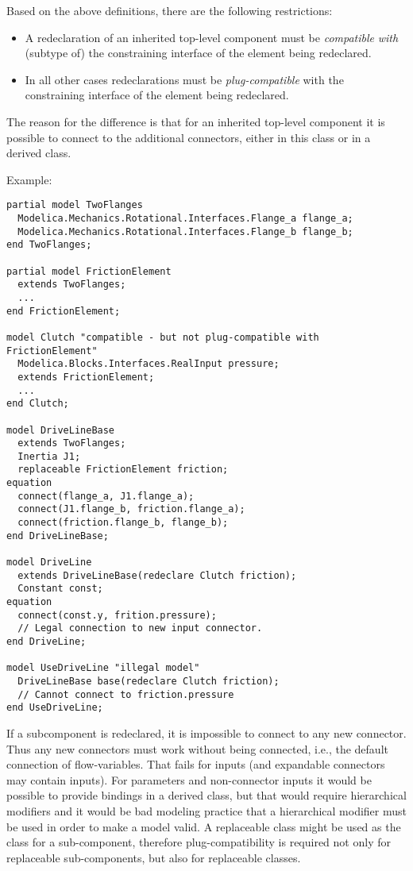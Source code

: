 Based on the above definitions, there are the following restrictions:
\begin{itemize}
\item
  A redeclaration of an inherited top-level component must be
  \emph{compatible} \emph{with} (subtype of) the constraining interface
  of the element being redeclared.
\item
  In all other cases redeclarations must be \emph{plug-compatible} with
  the constraining interface of the element being redeclared.
\end{itemize}

\begin{nonnormative}
The reason for the difference is that for an inherited
top-level component it is possible to connect to the additional
connectors, either in this class or in a derived class.

Example:
\begin{lstlisting}[language=modelica]
partial model TwoFlanges
  Modelica.Mechanics.Rotational.Interfaces.Flange_a flange_a;
  Modelica.Mechanics.Rotational.Interfaces.Flange_b flange_b;
end TwoFlanges;

partial model FrictionElement
  extends TwoFlanges;
  ...
end FrictionElement;

model Clutch "compatible - but not plug-compatible with FrictionElement"
  Modelica.Blocks.Interfaces.RealInput pressure;
  extends FrictionElement;
  ...
end Clutch;

model DriveLineBase
  extends TwoFlanges;
  Inertia J1;
  replaceable FrictionElement friction;
equation
  connect(flange_a, J1.flange_a);
  connect(J1.flange_b, friction.flange_a);
  connect(friction.flange_b, flange_b);
end DriveLineBase;

model DriveLine
  extends DriveLineBase(redeclare Clutch friction);
  Constant const;
equation
  connect(const.y, frition.pressure);
  // Legal connection to new input connector.
end DriveLine;

model UseDriveLine "illegal model"
  DriveLineBase base(redeclare Clutch friction);
  // Cannot connect to friction.pressure
end UseDriveLine;
\end{lstlisting}

If a subcomponent is redeclared, it is impossible to connect to
any new connector. Thus any new connectors must work without being
connected, i.e., the default connection of flow-variables. That fails
for inputs (and expandable connectors may contain inputs). For
parameters and non-connector inputs it would be possible to provide
bindings in a derived class, but that would require hierarchical
modifiers and it would be bad modeling practice that a hierarchical
modifier must be used in order to make a model valid. A replaceable
class might be used as the class for a sub-component, therefore
plug-compatibility is required not only for replaceable sub-components,
but also for replaceable classes.
\end{nonnormative}

